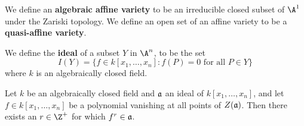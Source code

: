 \begin{definition}
    We define an \textbf{algebraic affine variety} to be an irreducible closed
    subset of $\A^1$ under the Zariski topology. We define an open set of an
    affine variety to be a  \textbf{quasi-affine variety}.
\end{definition}

\begin{definition}
    We define the \textbf{ideal} of a subset $Y$ in  $\A^n$, to be the set
    \begin{equation*}
        I(Y)=\{f \in k[x_1, \dots, x_n] : f(P)=0 \text{ for all } P \in Y\}
    \end{equation*}
    where $k$ is an algebraically closed field.
\end{definition}

\begin{theorem}\label{1.1.2}
    Let $k$ be an algebraically closed field and $\mathfrak{a}$ an ideal of $k[x_1, \dots,
    x_n]$, and let $f \in k[x_1, \dots, x_n]$ be a polynomial vanishing at all
    points of $Z(\mathfrak{a})$. Then there exists an $r \in \Z^+$ for which  $f^r \in
    \mathfrak{a}$.
\end{theorem}

